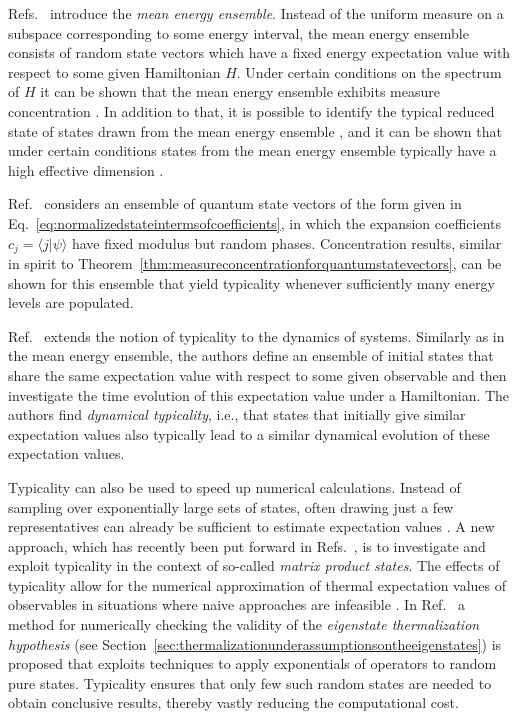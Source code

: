 \documentclass[a4paper,12pt,listof=totoc,index=totoc,bibliography=totoc,headsepline=false,headings=normal,BCOR16.153846mm,DIV12,headinclude,twoside,cleardoublepage=empty,numbers=noenddot,final]{scrreprt}
\theoremstyle{mystyle}
\numberwithin{equation}{section}
\numberwithin{figure}{section}
\numberwithin{lemma}{section}
\numberwithin{theorem}{section}
\numberwithin{corollary}{section}
\numberwithin{definition}{section}
\numberwithin{conjecture}{section}
\numberwithin{observation}{section}
\newcommand{\+}{\mkern2mu}
\newcommand{\texteqref}[1]{Eq.~\eqref{#1}}
\renewcommand{\H}{H}
\newcommand{\braket}[2]{\langle #1 | #2 \rangle}
\DeclareMathOperator{\1}{\mathds{1}}
\begin{document}
Refs.~\cite{Bender05,Brody07,1003.4982,1104.4625v1} introduce the \emph{mean energy ensemble}.
Instead of the uniform measure on a subspace corresponding to some energy interval, the mean energy ensemble consists of random state vectors which have a fixed energy expectation value with respect to some given Hamiltonian $\H$.
Under certain conditions on the spectrum of $\H$ it can be shown that the mean energy ensemble exhibits measure concentration \cite{1003.4982}.
In addition to that, it is possible to identify the typical reduced state of states drawn from the mean energy ensemble \cite{1003.4982}, and it can be shown that under certain conditions states from the mean energy ensemble typically have a high effective dimension \cite{Gogolin10-masterthesis}.

Ref.~\cite{Reimann07} considers an ensemble of quantum state vectors of the form given in \texteqref{eq:normalizedstateintermsofcoefficients}, in which the expansion coefficients $c_j = \braket{j}{\psi}$ have fixed modulus but random phases.
Concentration results, similar in spirit to Theorem~\ref{thm:measureconcentrationforquantumstatevectors}, can be shown for this ensemble that yield typicality whenever sufficiently many energy levels are populated.

Ref.~\cite{Bartsch09} extends the notion of typicality to the dynamics of systems.
Similarly as in the mean energy ensemble, the authors define an ensemble of initial states that share the same expectation value with respect to some given observable and then investigate the time evolution of this expectation value under a Hamiltonian.
The authors find \emph{dynamical typicality}, i.e., that states that initially give similar expectation values also typically lead to a similar dynamical evolution of these expectation values.

Typicality can also be used to speed up numerical calculations.
Instead of sampling over exponentially large sets of states, often drawing just a few representatives can already be sufficient to estimate expectation values \cite{Sugiura12}.
A new approach, which has recently been put forward in Refs.~\cite{Garnerone2010,Garnerone10-1,Garnerone2013,Garnerone2013a}, is to investigate and exploit typicality in the context of so-called \emph{matrix product states}.
The effects of typicality allow for the numerical approximation of thermal expectation values of observables in situations where naive approaches are infeasible \cite{Garnerone2013a}.
In Ref.~\cite{Steinigeweg2013} a method for numerically checking the validity of the \emph{eigenstate thermalization hypothesis} (see Section~\ref{sec:thermalizationunderassumptionsontheeigenstates}) is proposed that exploits techniques to apply exponentials of operators to random pure states.
Typicality ensures that only few such random states are needed to obtain conclusive results, thereby vastly reducing the computational cost.
\end{document}

